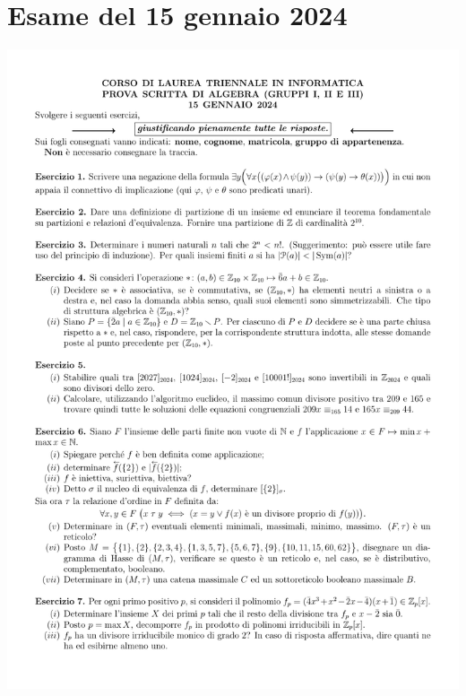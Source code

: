 \section{Esame del 15 gennaio 2024}
\begin{center}
	\includegraphics[scale=.85]{pdf/24-01-15}
\end{center}
